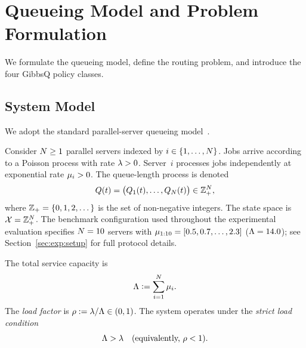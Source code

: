 
\section{Queueing Model and Problem Formulation}
\label{sec:model}

We formulate the queueing model, define the routing problem, and introduce the four GibbsQ policy classes.

\subsection{System Model}
\label{sec:model:system}

We adopt the standard parallel-server queueing model~\cite{kleinrock1975queueing,kelly2011reversibility,robert2003stochastic}.

\begin{definition}
\label{def:system}
Consider $N \geq 1$ parallel servers indexed by $i \in \{1, \dots, N\}$. Jobs arrive according to a Poisson process with rate $\lambda > 0$. Server~$i$ processes jobs independently at exponential rate $\mu_i > 0$. The queue-length process is denoted
\begin{equation}
\label{eq:queue_state}
Q(t) = \bigl(Q_{1}(t), \dots, Q_{N}(t)\bigr) \in \mathbb{Z}_+^N,
\end{equation}
where $\mathbb{Z}_+ = \{0, 1, 2, \dots\}$ is the set of non-negative integers. The state space is $\mathcal{X} = \mathbb{Z}_+^N$. The benchmark configuration used throughout the experimental evaluation specifies $N = 10$ servers with $\mu_{1:10} = [0.5, 0.7, \dots, 2.3]$ ($\Lambda = 14.0$); see Section~\ref{sec:exp:setup} for full protocol details.
\end{definition}

\begin{definition}
\label{def:load}
The total service capacity is
\begin{equation}
\label{eq:total_capacity}
\Lambda \mathrel{\mathop:}= \sum_{i=1}^{N} \mu_i.
\end{equation}
The \emph{load factor} is $\rho := \lambda/\Lambda \in (0,1)$.
The system operates under the \emph{strict load condition}
\begin{equation}
\label{eq:load_condition}
\Lambda > \lambda \quad (\text{equivalently, } \rho < 1).
\end{equation}
\end{definition}

